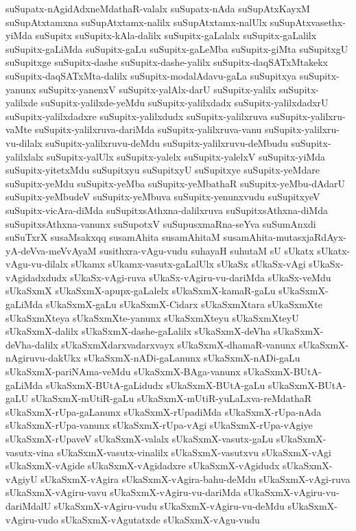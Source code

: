 {suSupatx-nAgidAdxneMdathaR-valalx
suSupatx-nAda
suSupAtxKayxM
suSupAtxtamxna
suSupAtxtamx-nalilx
suSupAtxtamx-nalUlx
suSupAtxvasethx-yiMda
suSupitx
suSupitx-kAla-dalilx
suSupitx-gaLalalx
suSupitx-gaLalilx
suSupitx-gaLiMda
suSupitx-gaLu
suSupitx-gaLeMba
suSupitx-giMta
suSupitxgU
suSupitxge
suSupitx-dashe
suSupitx-dashe-yalilx
suSupitx-daqSATxMtakekx
suSupitx-daqSATxMta-dalilx
suSupitx-modalAdavu-gaLa
suSupitxya
suSupitx-yanunx
suSupitx-yanenxV
suSupitx-yalAlx-darU
suSupitx-yalilx
suSupitx-yalilxde
suSupitx-yalilxde-yeMdu
suSupitx-yalilxdadx
suSupitx-yalilxdadxrU
suSupitx-yalilxdadxre
suSupitx-yalilxdudx
suSupitx-yalilxruva
suSupitx-yalilxru-vaMte
suSupitx-yalilxruva-dariMda
suSupitx-yalilxruva-vanu
suSupitx-yalilxru-vu-dilalx
suSupitx-yalilxruvu-deMdu
suSupitx-yalilxruvu-deMbudu
suSupitx-yalilxlalx
suSupitx-yalUlx
suSupitx-yalelx
suSupitx-yalelxV
suSupitx-yiMda
suSupitx-yitetxMdu
suSupitxyu
suSupitxyU
suSupitxye
suSupitx-yeMdare
suSupitx-yeMdu
suSupitx-yeMba
suSupitx-yeMbathaR
suSupitx-yeMbu-dAdarU
suSupitx-yeMbudeV
suSupitx-yeMbuva
suSupitx-yenunxvudu
suSupitxyeV
suSupitx-vicAra-diMda
suSupitxsAthxna-dalilxruva
suSupitxsAthxna-diMda
suSupitxsAthxna-vanunx
suSupotxV
suSupusxmaRna-seYva
suSumAnxdi
suSuTxrX
susaMsakxqq
susamAhita
susamAhitaM
susamAhita-mutasxjaRdAyx-yA-deVva-meVvAyaM
susithxra-vAgu-vudu
suhayaH
suhutaM
sU
sUkatx
sUkatx-vAgu-vu-dilalx
sUkamx
sUkamx-vasutx-gaLalUlx
sUkaSx
sUkaSx-vAgi
sUkaSx-vAgidadxdudx
sUkaSx-vAgi-ruva
sUkaSx-vAgiru-vu-dariMda
sUkaSx-veMdu
sUkaSxmX
sUkaSxmX-apupx-gaLalelx
sUkaSxmX-kamaR-gaLu
sUkaSxmX-gaLiMda
sUkaSxmX-gaLu
sUkaSxmX-Cidarx
sUkaSxmXtara
sUkaSxmXte
sUkaSxmXteya
sUkaSxmXte-yanunx
sUkaSxmXteyu
sUkaSxmXteyU
sUkaSxmX-dalilx
sUkaSxmX-dashe-gaLalilx
sUkaSxmX-deVha
sUkaSxmX-deVha-dalilx
sUkaSxmXdarxvadarxvayx
sUkaSxmX-dhamaR-vanunx
sUkaSxmX-nAgiruvu-dakUkx
sUkaSxmX-nADi-gaLanunx
sUkaSxmX-nADi-gaLu
sUkaSxmX-pariNAma-veMdu
sUkaSxmX-BAga-vanunx
sUkaSxmX-BUtA-gaLiMda
sUkaSxmX-BUtA-gaLidudx
sUkaSxmX-BUtA-gaLu
sUkaSxmX-BUtA-gaLU
sUkaSxmX-mUtiR-gaLu
sUkaSxmX-mUtiR-yuLaLxva-reMdathaR
sUkaSxmX-rUpa-gaLanunx
sUkaSxmX-rUpadiMda
sUkaSxmX-rUpa-nAda
sUkaSxmX-rUpa-vanunx
sUkaSxmX-rUpa-vAgi
sUkaSxmX-rUpa-vAgiye
sUkaSxmX-rUpaveV
sUkaSxmX-valalx
sUkaSxmX-vasutx-gaLu
sUkaSxmX-vasutx-vina
sUkaSxmX-vasutx-vinalilx
sUkaSxmX-vasutxvu
sUkaSxmX-vAgi
sUkaSxmX-vAgide
sUkaSxmX-vAgidadxre
sUkaSxmX-vAgidudx
sUkaSxmX-vAgiyU
sUkaSxmX-vAgira
sUkaSxmX-vAgira-bahu-deMdu
sUkaSxmX-vAgi-ruva
sUkaSxmX-vAgiru-vavu
sUkaSxmX-vAgiru-vu-dariMda
sUkaSxmX-vAgiru-vu-dariMdalU
sUkaSxmX-vAgiru-vudu
sUkaSxmX-vAgiru-vu-deMdu
sUkaSxmX-vAgiru-vudo
sUkaSxmX-vAgutatxde
sUkaSxmX-vAgu-vudu
}
